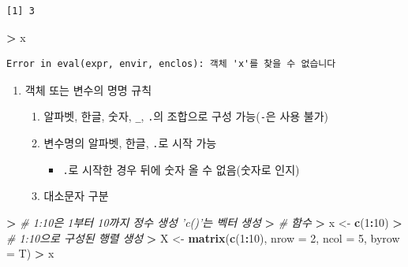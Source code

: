 \documentclass[12pt,a4paper]{book}
\newenvironment{Shaded}{\begin{snugshade}}{\end{snugshade}}
\newcommand{\KeywordTok}[1]{\textcolor[rgb]{0.13,0.29,0.53}{\textbf{#1}}}
\newcommand{\DataTypeTok}[1]{\textcolor[rgb]{0.13,0.29,0.53}{#1}}
\newcommand{\DecValTok}[1]{\textcolor[rgb]{0.00,0.00,0.81}{#1}}
\newcommand{\StringTok}[1]{\textcolor[rgb]{0.31,0.60,0.02}{#1}}
\newcommand{\CommentTok}[1]{\textcolor[rgb]{0.56,0.35,0.01}{\textit{#1}}}
\newcommand{\OperatorTok}[1]{\textcolor[rgb]{0.81,0.36,0.00}{\textbf{#1}}}
\newcommand{\ErrorTok}[1]{\textcolor[rgb]{0.64,0.00,0.00}{\textbf{#1}}}
\newcommand{\NormalTok}[1]{#1}
\providecommand{\tightlist}{%
  \setlength{\itemsep}{0pt}\setlength{\parskip}{0pt}}
\theoremstyle{definition}
\theoremstyle{definition}
\theoremstyle{definition}
\theoremstyle{remark}
\begin{document}
\begin{verbatim}
[1] 3
\end{verbatim}

\begin{Shaded}
\begin{Highlighting}[]
\OperatorTok{>}\StringTok{ }\NormalTok{x}
\end{Highlighting}
\end{Shaded}

\begin{verbatim}
Error in eval(expr, envir, enclos): 객체 'x'를 찾을 수 없습니다
\end{verbatim}

\begin{enumerate}
\def\labelenumi{\arabic{enumi}.}
\setcounter{enumi}{1}
\tightlist
\item
  객체 또는 변수의 명명 규칙

  \begin{enumerate}
  \def\labelenumii{\arabic{enumii})}
  \tightlist
  \item
    알파벳, 한글, 숫자, \texttt{\_}, \texttt{.}의 조합으로 구성
    가능(\texttt{-}은 사용 불가)
  \item
    변수명의 알파벳, 한글, \texttt{.}로 시작 가능

    \begin{itemize}
    \tightlist
    \item
      \texttt{.}로 시작한 경우 뒤에 숫자 올 수 없음(숫자로 인지)
    \end{itemize}
  \item
    대소문자 구분
  \end{enumerate}
\end{enumerate}

\begin{Shaded}
\begin{Highlighting}[]
\OperatorTok{>}\StringTok{ }\CommentTok{# 1:10은 1부터 10까지 정수 생성 'c()'는 벡터 생성}
\ErrorTok{>}\StringTok{ }\CommentTok{# 함수}
\ErrorTok{>}\StringTok{ }\NormalTok{x <-}\StringTok{ }\KeywordTok{c}\NormalTok{(}\DecValTok{1}\OperatorTok{:}\DecValTok{10}\NormalTok{)}
\OperatorTok{>}\StringTok{ }\CommentTok{# 1:10으로 구성된 행렬 생성}
\ErrorTok{>}\StringTok{ }\NormalTok{X <-}\StringTok{ }\KeywordTok{matrix}\NormalTok{(}\KeywordTok{c}\NormalTok{(}\DecValTok{1}\OperatorTok{:}\DecValTok{10}\NormalTok{), }\DataTypeTok{nrow =} \DecValTok{2}\NormalTok{, }\DataTypeTok{ncol =} \DecValTok{5}\NormalTok{, }\DataTypeTok{byrow =}\NormalTok{ T)}
\OperatorTok{>}\StringTok{ }\NormalTok{x}
\end{Highlighting}
\end{Shaded}
\end{document}
